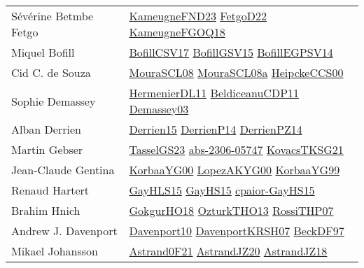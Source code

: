 {\begin{longtable}{p{4cm}p{20cm}}
S{\'{e}}v{\'{e}}rine Betmbe Fetgo & \href{papers/KameugneFND23.pdf}{KameugneFND23}\cite{KameugneFND23} \href{articles/FetgoD22.pdf}{FetgoD22}\cite{FetgoD22} \href{papers/KameugneFGOQ18.pdf}{KameugneFGOQ18}\cite{KameugneFGOQ18} \\
Miquel Bofill & \href{papers/BofillCSV17.pdf}{BofillCSV17}\cite{BofillCSV17} \href{papers/BofillGSV15.pdf}{BofillGSV15}\cite{BofillGSV15} \href{papers/BofillEGPSV14.pdf}{BofillEGPSV14}\cite{BofillEGPSV14} \\
Cid C. de Souza & \href{papers/MouraSCL08.pdf}{MouraSCL08}\cite{MouraSCL08} \href{papers/MouraSCL08a.pdf}{MouraSCL08a}\cite{MouraSCL08a} \href{articles/HeipckeCCS00.pdf}{HeipckeCCS00}\cite{HeipckeCCS00} \\
Sophie Demassey & \href{papers/HermenierDL11.pdf}{HermenierDL11}\cite{HermenierDL11} \href{articles/BeldiceanuCDP11.pdf}{BeldiceanuCDP11}\cite{BeldiceanuCDP11} \href{}{Demassey03}\cite{Demassey03} \\
Alban Derrien & \href{}{Derrien15}\cite{Derrien15} \href{papers/DerrienP14.pdf}{DerrienP14}\cite{DerrienP14} \href{papers/DerrienPZ14.pdf}{DerrienPZ14}\cite{DerrienPZ14} \\
Martin Gebser & \href{papers/TasselGS23.pdf}{TasselGS23}\cite{TasselGS23} \href{articles/abs-2306-05747.pdf}{abs-2306-05747}\cite{abs-2306-05747} \href{papers/KovacsTKSG21.pdf}{KovacsTKSG21}\cite{KovacsTKSG21} \\
Jean{-}Claude Gentina & \href{articles/KorbaaYG00.pdf}{KorbaaYG00}\cite{KorbaaYG00} \href{articles/LopezAKYG00.pdf}{LopezAKYG00}\cite{LopezAKYG00} \href{papers/KorbaaYG99.pdf}{KorbaaYG99}\cite{KorbaaYG99} \\
Renaud Hartert & \href{papers/GayHLS15.pdf}{GayHLS15}\cite{GayHLS15} \href{papers/GayHS15.pdf}{GayHS15}\cite{GayHS15} \href{papers/cpaior-GayHS15.pdf}{cpaior-GayHS15}\cite{cpaior-GayHS15} \\
Brahim Hnich & \href{}{GokgurHO18}\cite{GokgurHO18} \href{articles/OzturkTHO13.pdf}{OzturkTHO13}\cite{OzturkTHO13} \href{papers/RossiTHP07.pdf}{RossiTHP07}\cite{RossiTHP07} \\
Andrew J. Davenport & \href{papers/Davenport10.pdf}{Davenport10}\cite{Davenport10} \href{papers/DavenportKRSH07.pdf}{DavenportKRSH07}\cite{DavenportKRSH07} \href{papers/BeckDF97.pdf}{BeckDF97}\cite{BeckDF97} \\
Mikael Johansson & \href{papers/Astrand0F21.pdf}{Astrand0F21}\cite{Astrand0F21} \href{articles/AstrandJZ20.pdf}{AstrandJZ20}\cite{AstrandJZ20} \href{papers/AstrandJZ18.pdf}{AstrandJZ18}\cite{AstrandJZ18} \\

\end{longtable}}

